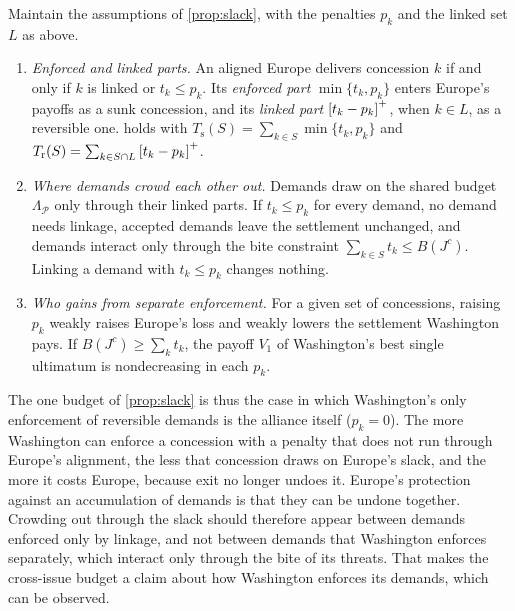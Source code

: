 \begin{proposition}[Linkage]\label{prop:linkage}
Maintain the assumptions of \cref{prop:slack}, with the penalties $p_k$ and the linked set $L$ as above.
\begin{enumerate}[label=(\alph*)]
\item \emph{Enforced and linked parts.} An aligned Europe delivers concession $k$ if and only if $k$ is linked or $t_k\le p_k$. Its \emph{enforced part} $\min\{t_k,p_k\}$ enters Europe's payoffs as a sunk concession, and its \emph{linked part} $\left[t_k-p_k\right]^{+}$, when $k\in L$, as a reversible one.  holds with $T_{\mathrm s}(S)=\sum_{k\in S}\min\{t_k,p_k\}$ and $T_{\mathrm r}(S)=\sum_{k\in S\cap L}\left[t_k-p_k\right]^{+}$.
\item \emph{Where demands crowd each other out.} Demands draw on the shared budget $\Lambda_{\mathcal P}$ only through their linked parts. If $t_k\le p_k$ for every demand, no demand needs linkage, accepted demands leave the settlement unchanged, and demands interact only through the bite constraint $\sum_{k\in S}t_k\le B(J^c)$. Linking a demand with $t_k\le p_k$ changes nothing.
\item \emph{Who gains from separate enforcement.} For a given set of concessions, raising $p_k$ weakly raises Europe's loss and weakly lowers the settlement Washington pays. If $B(J^c)\ge\sum_k t_k$, the payoff $V_1$ of Washington's best single ultimatum is nondecreasing in each $p_k$.
\end{enumerate}
\end{proposition}

The one budget of \cref{prop:slack} is thus the case in which Washington's only enforcement of reversible demands is the alliance itself ($p_k=0$). The more Washington can enforce a concession with a penalty that does not run through Europe's alignment, the less that concession draws on Europe's slack, and the more it costs Europe, because exit no longer undoes it. Europe's protection against an accumulation of demands is that they can be undone together. Crowding out through the slack should therefore appear between demands enforced only by linkage, and not between demands that Washington enforces separately, which interact only through the bite of its threats. That makes the cross-issue budget a claim about how Washington enforces its demands, which can be observed.

